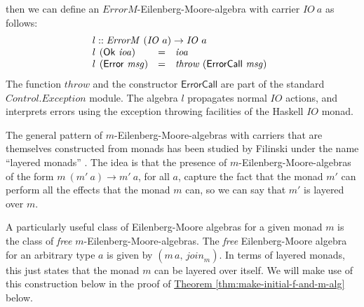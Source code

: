 \documentclass{jfp1}
\newcommand{\thmref}[1]{\hyperref[#1]{Theorem \ref*{#1}}}
\begin{document}
then we can define an $\mathit{ErrorM}$-Eilenberg-Moore-algebra with
carrier $\mathit{IO}~a$ as follows:
\begin{displaymath}
  \begin{array}{l}
    l :: \mathit{ErrorM}~(\mathit{IO}~a) \to \mathit{IO}~a \\
    \begin{array}{@{}l@{\hspace{0.4em}}lcl}
      l&(\mathsf{Ok}~\mathit{ioa}) & = & \mathit{ioa} \\
      l&(\mathsf{Error}~\mathit{msg}) & = & \mathit{throw}~(\mathsf{ErrorCall}~\mathit{msg})
    \end{array}
  \end{array}
\end{displaymath}
The function $\mathit{throw}$ and the constructor $\mathsf{ErrorCall}$
are part of the standard $\mathit{Control.Exception}$ module. The
algebra $l$ propagates normal $\mathit{IO}$ actions, and interprets
errors using the exception throwing facilities of the Haskell
$\mathit{IO}$ monad.

The general pattern of $m$-Eilenberg-Moore-algebras with carriers that
are themselves constructed from monads has been studied by Filinski
under the name ``layered monads'' \cite{filinski99representing}. The
idea is that the presence of $m$-Eilenberg-Moore-algebras of the form
$m~(m'~a) \to m'~a$, for all $a$, capture the fact that the monad $m'$
can perform all the effects that the monad $m$ can, so we can say that
$m'$ is layered over $m$.

A particularly useful class of Eilenberg-Moore algebras for a given
monad $m$ is the class of \emph{free}
$m$-Eilenberg-Moore-algebras. The \emph{free} Eilenberg-Moore algebra
for an arbitrary type $a$ is given by $(m\,a, \,\mathit{join}_m)$. In
terms of layered monads, this just states that the monad $m$ can be
layered over itself. We will make use of this construction below in
the proof of \thmref{thm:make-initial-f-and-m-alg} below.
\end{document}
